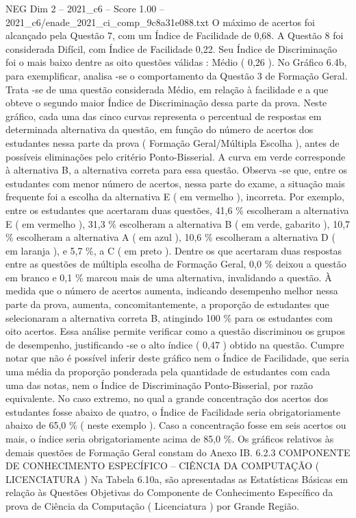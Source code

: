 \begin{textsample}{NEG Dim 2 – 2021\_c6 – Score 1.00 – 2021\_c6/enade\_2021\_ci\_comp\_9c8a31e088.txt}
O máximo de acertos foi alcançado pela Questão 7, com um Índice de Facilidade de 0,68.
A Questão 8 foi considerada Difícil, com Índice de Facilidade 0,22.
Seu Índice de Discriminação foi o mais baixo dentre as oito questões válidas : Médio ( 0,26 ).
No Gráfico 6.4b, para exemplificar, analisa -se o comportamento da Questão 3 de Formação Geral.
Trata -se de uma questão considerada Médio, em relação à facilidade e a que obteve o segundo maior Índice de Discriminação dessa parte da prova.
Neste gráfico, cada uma das cinco curvas representa o percentual de respostas em determinada alternativa da questão, em função do número de acertos dos estudantes nessa parte da prova ( Formação Geral/Múltipla Escolha ), antes de possíveis eliminações pelo critério Ponto-Bisserial.
A curva em verde corresponde à alternativa B, a alternativa correta para essa questão.
Observa -se que, entre os estudantes com menor número de acertos, nessa parte do exame, a situação mais frequente foi a escolha da alternativa E ( em vermelho ), incorreta.
Por exemplo, entre os estudantes que acertaram duas questões, 41,6 \% escolheram a alternativa E ( em vermelho ), 31,3 \% escolheram a alternativa B ( em verde, gabarito ), 10,7 \% escolheram a alternativa A ( em azul ), 10,6 \% escolheram a alternativa D ( em laranja ), e 5,7 \%, a C ( em preto ).
Dentre os que acertaram duas respostas entre as questões de múltipla escolha de Formação Geral, 0,0 \% deixou a questão em branco e 0,1 \% marcou mais de uma alternativa, invalidando a questão.
À medida que o número de acertos aumenta, indicando desempenho melhor nessa parte da prova, aumenta, concomitantemente, a proporção de estudantes que selecionaram a alternativa correta B, atingindo 100 \% para os estudantes com oito acertos.
Essa análise permite verificar como a questão discriminou os grupos de desempenho, justificando -se o alto índice ( 0,47 ) obtido na questão.
Cumpre notar que não é possível inferir deste gráfico nem o Índice de Facilidade, que seria uma média da proporção ponderada pela quantidade de estudantes com cada uma das notas, nem o Índice de Discriminação Ponto-Bisserial, por razão equivalente.
No caso extremo, no qual a grande concentração dos acertos dos estudantes fosse abaixo de quatro, o Índice de Facilidade seria obrigatoriamente abaixo de 65,0 \% ( neste exemplo ).
Caso a concentração fosse em seis acertos ou mais, o índice seria obrigatoriamente acima de 85,0 \%.
Os gráficos relativos às demais questões de Formação Geral constam do Anexo IB. 6.2.3 COMPONENTE DE CONHECIMENTO ESPECÍFICO – CIÊNCIA DA COMPUTAÇÃO ( LICENCIATURA ) Na Tabela 6.10a, são apresentadas as Estatísticas Básicas em relação às Questões Objetivas do Componente de Conhecimento Específico da prova de Ciência da Computação ( Licenciatura ) por Grande Região.

\end{textsample}
